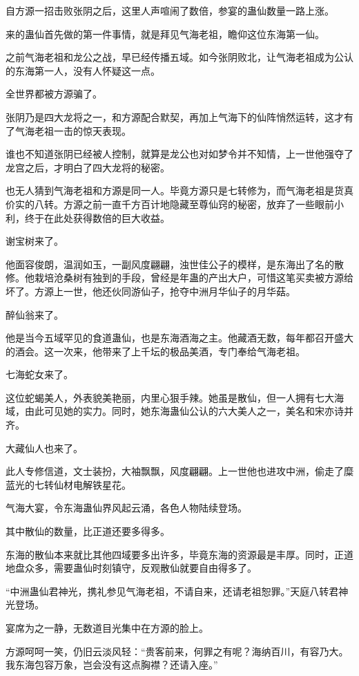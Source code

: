 \begin{this_body}
自方源一招击败张阴之后，这里人声喧闹了数倍，参宴的蛊仙数量一路上涨。

来的蛊仙首先做的第一件事情，就是拜见气海老祖，瞻仰这位东海第一仙。

之前气海老祖和龙公之战，早已经传播五域。如今张阴败北，让气海老祖成为公认的东海第一人，没有人怀疑这一点。

全世界都被方源骗了。

张阴乃是四大龙将之一，和方源配合默契，再加上气海下的仙阵悄然运转，这才有了气海老祖一击的惊天表现。

谁也不知道张阴已经被人控制，就算是龙公也对如梦令并不知情，上一世他强夺了龙宫之后，才明白了四大龙将的秘密。

也无人猜到气海老祖和方源是同一人。毕竟方源只是七转修为，而气海老祖是货真价实的八转。方源之前一直千方百计地隐藏至尊仙窍的秘密，放弃了一些眼前小利，终于在此处获得数倍的巨大收益。

谢宝树来了。

他面容俊朗，温润如玉，一副风度翩翩，浊世佳公子的模样，是东海出了名的散修。他栽培沧桑树有独到的手段，曾经是年蛊的产出大户，可惜这笔买卖被方源给坏了。方源上一世，他还伙同游仙子，抢夺中洲月华仙子的月华菇。

醉仙翁来了。

他是当今五域罕见的食道蛊仙，也是东海酒海之主。他藏酒无数，每年都召开盛大的酒会。这一次来，他带来了上千坛的极品美酒，专门奉给气海老祖。

七海蛇女来了。

这位蛇蝎美人，外表貌美艳丽，内里心狠手辣。她虽是散仙，但一人拥有七大海域，由此可见她的实力。同时，她东海蛊仙公认的六大美人之一，美名和宋亦诗并齐。

大藏仙人也来了。

此人专修信道，文士装扮，大袖飘飘，风度翩翩。上一世他也进攻中洲，偷走了糜蓝光的七转仙材电解铁星花。

气海大宴，令东海蛊仙界风起云涌，各色人物陆续登场。

其中散仙的数量，比正道还要多得多。

东海的散仙本来就比其他四域要多出许多，毕竟东海的资源最是丰厚。同时，正道地盘众多，需要蛊仙时刻镇守，反观散仙就要自由得多了。

“中洲蛊仙君神光，携礼参见气海老祖，不请自来，还请老祖恕罪。”天庭八转君神光登场。

宴席为之一静，无数道目光集中在方源的脸上。

方源呵呵一笑，仍旧云淡风轻：“贵客前来，何罪之有呢？海纳百川，有容乃大。我东海包容万象，岂会没有这点胸襟？还请入座。”


\end{this_body}
